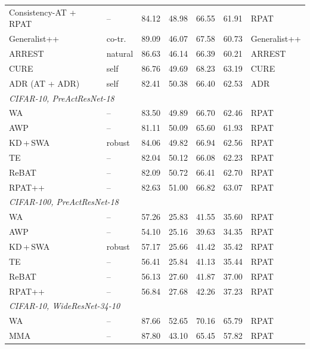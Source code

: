 \begin{table}[!htbp]
\begin{tabular}{llrrrrl}
    Consistency-AT + RPAT     & --      & 84.12 & 48.98 & 66.55 & 61.91 & RPAT \\
    Generalist++              & co-tr.  & 89.09 & 46.07 & 67.58 & 60.73 & Generalist++ \\
    ARREST                    & natural & 86.63 & 46.14 & 66.39 & 60.21 & ARREST \\
    CURE                      & self    & 86.76 & 49.69 & 68.23 & 63.19 & CURE \\
    ADR (AT + ADR)            & self    & 82.41 & 50.38 & 66.40 & 62.53 & ADR \\
    \midrule
    \multicolumn{7}{l}{\emph{CIFAR-10, PreActResNet-18}} \\
    WA \citep{swa}            & --      & 83.50 & 49.89 & 66.70 & 62.46 & RPAT \\
    AWP \citep{2020_awp}      & --      & 81.11 & 50.09 & 65.60 & 61.93 & RPAT \\
    KD\,+\,SWA \citep{kdswa}   & robust  & 84.06 & 49.82 & 66.94 & 62.56 & RPAT \\
    TE \citep{te}             & --      & 82.04 & 50.12 & 66.08 & 62.23 & RPAT \\
    ReBAT \citep{rebat}       & --      & 82.09 & 50.72 & 66.41 & 62.70 & RPAT \\
    RPAT++ \citep{rpat}       & --      & 82.63 & 51.00 & 66.82 & 63.07 & RPAT \\
    \midrule
    \multicolumn{7}{l}{\emph{CIFAR-100, PreActResNet-18}} \\
    WA \citep{swa}            & --      & 57.26 & 25.83 & 41.55 & 35.60 & RPAT \\
    AWP \citep{2020_awp}      & --      & 54.10 & 25.16 & 39.63 & 34.35 & RPAT \\
    KD\,+\,SWA \citep{kdswa}   & robust  & 57.17 & 25.66 & 41.42 & 35.42 & RPAT \\
    TE \citep{te}             & --      & 56.41 & 25.84 & 41.13 & 35.44 & RPAT \\
    ReBAT \citep{rebat}       & --      & 56.13 & 27.60 & 41.87 & 37.00 & RPAT \\
    RPAT++ \citep{rpat}       & --      & 56.84 & 27.68 & 42.26 & 37.23 & RPAT \\
    \midrule
    \multicolumn{7}{l}{\emph{CIFAR-10, WideResNet-34-10}} \\
    WA \citep{swa}            & --      & 87.66 & 52.65 & 70.16 & 65.79 & RPAT \\
    MMA \citep{mma}           & --      & 87.80 & 43.10 & 65.45 & 57.82 & RPAT \\

\end{tabular}
\end{table}

